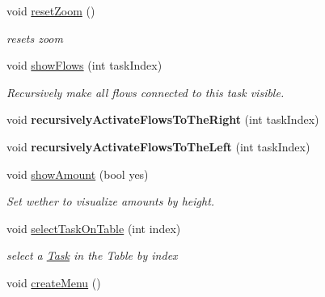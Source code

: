 \begin{DoxyCompactItemize}
\item 
\hypertarget{class_main_window_a6a403614bd858e16e35af405c562fc9b}{}void \hyperlink{class_main_window_a6a403614bd858e16e35af405c562fc9b}{reset\+Zoom} ()\label{class_main_window_a6a403614bd858e16e35af405c562fc9b}

\begin{DoxyCompactList}\small\item\em resets zoom \end{DoxyCompactList}\item 
\hypertarget{class_main_window_aa9bca4a0b90acf75f82a7f1acc411acb}{}void \hyperlink{class_main_window_aa9bca4a0b90acf75f82a7f1acc411acb}{show\+Flows} (int task\+Index)\label{class_main_window_aa9bca4a0b90acf75f82a7f1acc411acb}

\begin{DoxyCompactList}\small\item\em Recursively make all flows connected to this task visible. \end{DoxyCompactList}\item 
\hypertarget{class_main_window_a8c5ff24ebba239b7dbf435b3dd50e1f3}{}void {\bfseries recursively\+Activate\+Flows\+To\+The\+Right} (int task\+Index)\label{class_main_window_a8c5ff24ebba239b7dbf435b3dd50e1f3}

\item 
\hypertarget{class_main_window_af938550e53f022625dd21ff1536bb36b}{}void {\bfseries recursively\+Activate\+Flows\+To\+The\+Left} (int task\+Index)\label{class_main_window_af938550e53f022625dd21ff1536bb36b}

\item 
\hypertarget{class_main_window_a63772da55576703fd979ced117a9fa89}{}void \hyperlink{class_main_window_a63772da55576703fd979ced117a9fa89}{show\+Amount} (bool yes)\label{class_main_window_a63772da55576703fd979ced117a9fa89}

\begin{DoxyCompactList}\small\item\em Set wether to visualize amounts by height. \end{DoxyCompactList}\item 
\hypertarget{class_main_window_a28e45b950a89e35ffb5b1d1e345e7aa6}{}void \hyperlink{class_main_window_a28e45b950a89e35ffb5b1d1e345e7aa6}{select\+Task\+On\+Table} (int index)\label{class_main_window_a28e45b950a89e35ffb5b1d1e345e7aa6}

\begin{DoxyCompactList}\small\item\em select a \hyperlink{struct_task}{Task} in the Table by index \end{DoxyCompactList}\item 
\hypertarget{class_main_window_a03799692902ab88a551b4dca1fa042db}{}void \hyperlink{class_main_window_a03799692902ab88a551b4dca1fa042db}{create\+Menu} ()\label{class_main_window_a03799692902ab88a551b4dca1fa042db}


\end{DoxyCompactItemize}
